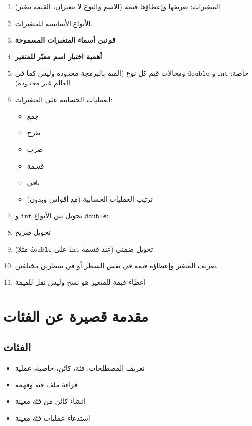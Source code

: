 ﻿\documentclass[14pt]{extarticle}
\begin{document}
\begin{enumerate}
    \item  المتغيرات: تعريفها وإعطاؤها قيمة (الاسم والنوع لا يتغيران، القيمة تتغير)
    \item  الأنواع الأساسية للمتغيرات،
    \item  \textbf{قوانين أسماء المتغيرات المسموحة}
    \item  \textbf{أهمية اختيار اسم معبّر للمتغير}
    \item  خاصة: $\mathtt{int}$ و $\mathtt{double}$ ومجالات قيم كل نوع (القيم بالبرمجة محدودة وليس كما في العالم غير محدودة)
    \item  العمليات الحسابية على المتغيرات:
    \begin{itemize}
        \item جمع
        \item طرح
        \item ضرب
        \item قسمة
        \item باقي
        \item ترتيب العمليات الحسابية (مع أقواس وبدون)
    \end{itemize}
    \item  تحويل بين الأنواع  $\mathtt{int}$ و $\mathtt{double}$:
    \item تحويل صريح
    \item تحويل ضمني (عند قسمة $\mathtt{int}$ على $\mathtt{double}$ مثلا)
    \item  تعريف المتغير وإعطاؤه قيمة في نفس السطر أو في سطرين مختلفين.
    \item  إعطاء قيمة للمتغير هو نسخ وليس نقل للقيمة
\end{enumerate}

\clearpage
\section{مقدمة قصيرة عن الفئات}

\subsection{الفئات}
\begin{itemize}
    \item تعريف المصطلحات: فئة، كائن، خاصية، عملية
    \item قراءة ملف فئة وفهمه
    \item إنشاء كائن من فئة معينة
    \item استدعاء عمليات فئة معينة
\end{itemize}
\end{document}
